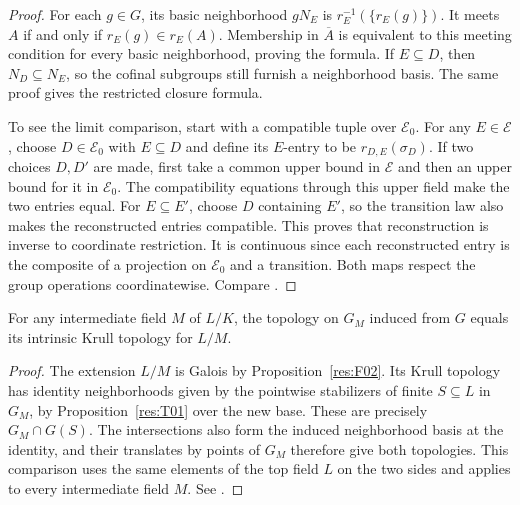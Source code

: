\begin{proof}
For each \(g\in G\), its basic neighborhood \(gN_E\) is
\(r_E^{-1}(\{r_E(g)\})\). It meets \(A\) if and only if
\(r_E(g)\in r_E(A)\). Membership in \(\overline A\) is equivalent
to this meeting condition for every basic neighborhood, proving the
formula. If \(E\subseteq D\), then \(N_D\subseteq N_E\), so the
cofinal subgroups still furnish a neighborhood basis. The same
proof gives the restricted closure formula.

To see the limit comparison, start with a compatible tuple over
\(\mathcal E_0\). For any \(E\in\mathcal E\), choose
\(D\in\mathcal E_0\) with \(E\subseteq D\) and define its \(E\)-entry
to be \(r_{D,E}(\sigma_D)\). If two choices \(D,D'\) are made, first
take a common upper bound in \(\mathcal E\) and then an upper
bound for it in \(\mathcal E_0\). The compatibility equations
through this upper field make the two entries equal. For
\(E\subseteq E'\), choose \(D\) containing \(E'\), so the transition
law also makes the reconstructed entries compatible. This proves
that reconstruction is inverse to coordinate restriction.
It is continuous since each reconstructed entry is the composite
of a projection on \(\mathcal E_0\) and a transition. Both maps
respect the group operations coordinatewise. Compare
\cite[Proposition 7.12(b) and Example 7.26]{milne}.
\end{proof}

\begin{proposition}
\label{res:T08}
For any intermediate field \(M\) of \(L/K\), the topology on \(G_M\)
induced from \(G\) equals its intrinsic Krull topology for \(L/M\).
\end{proposition}

\begin{proof}
The extension \(L/M\) is Galois by Proposition~\ref{res:F02}. Its
Krull topology has identity neighborhoods given by the pointwise
stabilizers of finite \(S\subseteq L\) in \(G_M\), by
Proposition~\ref{res:T01} over the new base. These are precisely
\(G_M\cap G(S)\). The intersections also form the induced
neighborhood basis at the identity, and their translates by
points of \(G_M\) therefore give both topologies. This comparison
uses the same elements of the top field \(L\) on the two sides and
applies to every intermediate field \(M\).
See \cite[Theorem 2.11.3]{rz}.
\end{proof}
